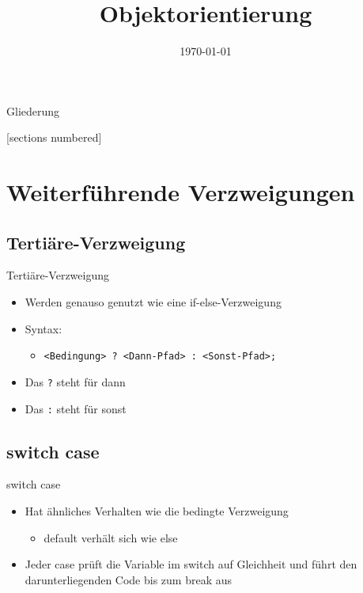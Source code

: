 



\title{Objektorientierung}
\date{\today}




\maketitle

\begin{frame}{Gliederung}
	\begin{multicols}{2}
		[sections numbered]
		\tableofcontents
	\end{multicols}
\end{frame}

\section{Weiterführende Verzweigungen}
\subsection{Tertiäre-Verzweigung}
\begin{frame}{Tertiäre-Verzweigung}
	\begin{itemize}
		\item Werden genauso genutzt wie eine if-else-Verzweigung
		\item Syntax:
		\begin{itemize}
			\item \texttt{\alert{<Bedingung>} ? \alert{<Dann-Pfad>} : \alert{<Sonst-Pfad>};}
		\end{itemize}
		\item Das \alert{\texttt{?}} steht für \alert{dann}
		\item Das \alert{\texttt{:}} steht für \alert{sonst}
	\end{itemize}		
	
\end{frame}

\subsection{switch case}
\begin{frame}{switch case}
	\begin{itemize}
		\item Hat ähnliches Verhalten wie die bedingte Verzweigung
		\begin{itemize}
			\item \alert{default} verhält sich wie \alert{else}
		\end{itemize}
		\item Jeder \alert{case} prüft die Variable im \alert{switch} auf Gleichheit und führt den darunterliegenden Code bis zum \alert{break} aus
	\end{itemize}
	
\end{frame}

